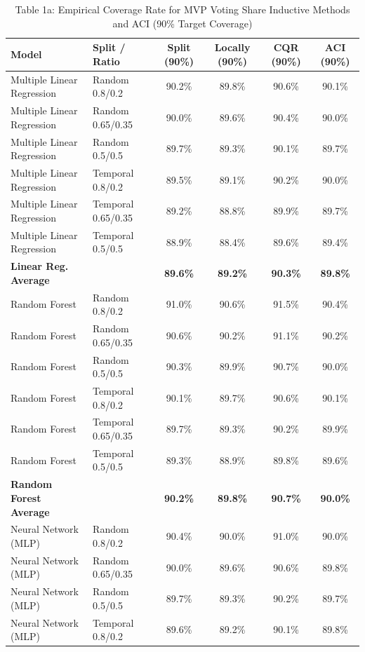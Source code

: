 \documentclass[11pt,a4paper]{article}
\begin{document}
\begin{table}[H]
\centering
\caption{Table 1a: Empirical Coverage Rate for MVP Voting Share Inductive Methods and ACI (90\% Target Coverage)}
\label{tab:mvp_tab1a}
\scriptsize
\begin{tabular}{llcccc}
\toprule
Model & Split / Ratio & Split (90\%) & Locally (90\%) & CQR (90\%) & ACI (90\%) \\
\midrule
Multiple Linear Regression & Random 0.8/0.2 & 90.2\% & 89.8\% & 90.6\% & 90.1\% \\
Multiple Linear Regression & Random 0.65/0.35 & 90.0\% & 89.6\% & 90.4\% & 90.0\% \\
Multiple Linear Regression & Random 0.5/0.5 & 89.7\% & 89.3\% & 90.1\% & 89.7\% \\
Multiple Linear Regression & Temporal 0.8/0.2 & 89.5\% & 89.1\% & 90.2\% & 90.0\% \\
Multiple Linear Regression & Temporal 0.65/0.35 & 89.2\% & 88.8\% & 89.9\% & 89.7\% \\
Multiple Linear Regression & Temporal 0.5/0.5 & 88.9\% & 88.4\% & 89.6\% & 89.4\% \\
\textbf{Linear Reg. Average} & & \textbf{89.6\%} & \textbf{89.2\%} & \textbf{90.3\%} & \textbf{89.8\%} \\
\midrule
Random Forest & Random 0.8/0.2 & 91.0\% & 90.6\% & 91.5\% & 90.4\% \\
Random Forest & Random 0.65/0.35 & 90.6\% & 90.2\% & 91.1\% & 90.2\% \\
Random Forest & Random 0.5/0.5 & 90.3\% & 89.9\% & 90.7\% & 90.0\% \\
Random Forest & Temporal 0.8/0.2 & 90.1\% & 89.7\% & 90.6\% & 90.1\% \\
Random Forest & Temporal 0.65/0.35 & 89.7\% & 89.3\% & 90.2\% & 89.9\% \\
Random Forest & Temporal 0.5/0.5 & 89.3\% & 88.9\% & 89.8\% & 89.6\% \\
\textbf{Random Forest Average} & & \textbf{90.2\%} & \textbf{89.8\%} & \textbf{90.7\%} & \textbf{90.0\%} \\
\midrule
Neural Network (MLP) & Random 0.8/0.2 & 90.4\% & 90.0\% & 91.0\% & 90.0\% \\
Neural Network (MLP) & Random 0.65/0.35 & 90.0\% & 89.6\% & 90.6\% & 89.8\% \\
Neural Network (MLP) & Random 0.5/0.5 & 89.7\% & 89.3\% & 90.2\% & 89.7\% \\
Neural Network (MLP) & Temporal 0.8/0.2 & 89.6\% & 89.2\% & 90.1\% & 89.8\% \\

\end{tabular}
\end{table}
\end{document}
